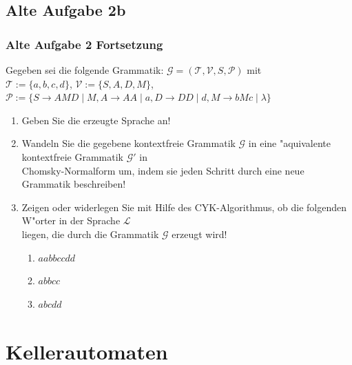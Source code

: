 \subsection{Alte Aufgabe 2b}
\begin{frame}
	\frametitle{Alte Aufgabe 2 Fortsetzung}
	Gegeben sei die folgende Grammatik: $\mathcal{G} = (\mathcal{T},\mathcal{V},S,
	\mathcal{P})$ mit\\
	$\mathcal{T} := \{a,b,c,d\}$, $\mathcal{V} := \{S,A,D,M\}$, $\mathcal{P} := \{
	S \rightarrow AMD \; | \; M, A \rightarrow AA \; | \; a, D \rightarrow DD \; | \; d,
	M \rightarrow bMc \; | \; \lambda\}$
	\begin{enumerate}
		\item Geben Sie die erzeugte Sprache an!
		\item Wandeln Sie die gegebene kontextfreie Grammatik $\mathcal{G}$ in eine
		"aquivalente kontextfreie Grammatik $\mathcal{G}'$ in\\
		Chomsky-Normalform um, indem sie jeden Schritt durch eine neue Grammatik beschreiben!
		\item Zeigen oder widerlegen Sie mit Hilfe des CYK-Algorithmus, ob die folgenden
		W"orter in der Sprache $\mathcal{L}$\\
		liegen, die durch die Grammatik $\mathcal{G}$ erzeugt wird!
		\begin{enumerate}
			\item $aabbccdd$
			\item $abbcc$
			\item $abcdd$
		\end{enumerate}
	\end{enumerate}
\end{frame}

\section{Kellerautomaten}
